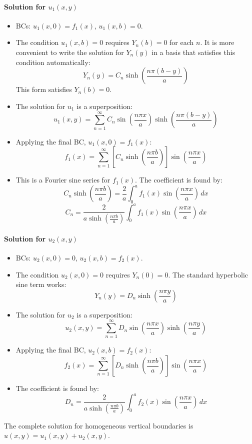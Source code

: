 \documentclass{article}
\begin{document}
	\paragraph{Solution for $u_1(x,y)$}
	\begin{itemize}
		\item BCs: $u_1(x,0) = f_1(x)$, $u_1(x,b)=0$.
		\item The condition $u_1(x,b)=0$ requires $Y_n(b)=0$ for each $n$. It is more convenient to write the solution for $Y_n(y)$ in a basis that satisfies this condition automatically:
		$$
		Y_n(y) = C_n \sinh\left(\frac{n\pi(b-y)}{a}\right)
		$$
		This form satisfies $Y_n(b)=0$.
		\item The solution for $u_1$ is a superposition:
		$$
		u_1(x,y) = \sum_{n=1}^{\infty} C_n \sin\left(\frac{n\pi x}{a}\right) \sinh\left(\frac{n\pi(b-y)}{a}\right)
		$$
		\item Applying the final BC, $u_1(x,0) = f_1(x)$:
		$$
		f_1(x) = \sum_{n=1}^{\infty} \left[ C_n \sinh\left(\frac{n\pi b}{a}\right) \right] \sin\left(\frac{n\pi x}{a}\right)
		$$
		\item This is a Fourier sine series for $f_1(x)$. The coefficient is found by:
		$$
		C_n \sinh\left(\frac{n\pi b}{a}\right) = \frac{2}{a} \int_0^a f_1(x) \sin\left(\frac{n\pi x}{a}\right) \,dx
		$$
		$$
		C_n = \frac{2}{a \sinh\left(\frac{n\pi b}{a}\right)} \int_0^a f_1(x) \sin\left(\frac{n\pi x}{a}\right) \,dx
		$$
	\end{itemize}
	
	\paragraph{Solution for $u_2(x,y)$}
	\begin{itemize}
		\item BCs: $u_2(x,0) = 0$, $u_2(x,b)=f_2(x)$.
		\item The condition $u_2(x,0)=0$ requires $Y_n(0)=0$. The standard hyperbolic sine term works:
		$$
		Y_n(y) = D_n \sinh\left(\frac{n\pi y}{a}\right)
		$$
		\item The solution for $u_2$ is a superposition:
		$$
		u_2(x,y) = \sum_{n=1}^{\infty} D_n \sin\left(\frac{n\pi x}{a}\right) \sinh\left(\frac{n\pi y}{a}\right)
		$$
		\item Applying the final BC, $u_2(x,b) = f_2(x)$:
		$$
		f_2(x) = \sum_{n=1}^{\infty} \left[ D_n \sinh\left(\frac{n\pi b}{a}\right) \right] \sin\left(\frac{n\pi x}{a}\right)
		$$
		\item The coefficient is found by:
		$$
		D_n = \frac{2}{a \sinh\left(\frac{n\pi b}{a}\right)} \int_0^a f_2(x) \sin\left(\frac{n\pi x}{a}\right) \,dx
		$$
	\end{itemize}
	The complete solution for homogeneous vertical boundaries is $u(x,y) = u_1(x,y) + u_2(x,y)$.
\end{document}
